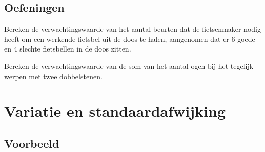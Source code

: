 \documentclass[12pt,twoside]{article}
\begin{document}
\subsection{Oefeningen}

\begin{oefening}
Bereken de verwachtingswaarde van het aantal beurten dat de fietsenmaker nodig heeft om een werkende fietsbel uit de doos te halen, aangenomen dat er 6 goede en 4 slechte fietsbellen in de doos zitten.
\end{oefening}

\begin{oefening}
Bereken de verwachtingswaarde van de som van het aantal ogen bij het tegelijk werpen met twee dobbelstenen.
\end{oefening}

\pagebreak

\section{Variatie en standaardafwijking}

\subsection{Voorbeeld}
\end{document}
